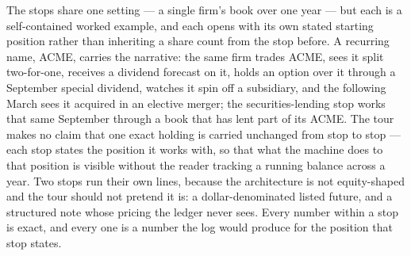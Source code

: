 The stops share one setting --- a single firm's book over one year --- but each is a
self-contained worked example, and each opens with its own stated starting position
rather than inheriting a share count from the stop before. A recurring name, ACME,
carries the narrative: the same firm trades ACME, sees it split two-for-one, receives
a dividend forecast on it, holds an option over it through a September special
dividend, watches it spin off a subsidiary, and the following March sees it acquired
in an elective merger; the securities-lending stop works that same September through a
book that has lent part of its ACME. The tour makes no claim that one exact holding is
carried unchanged from stop to stop --- each stop states the position it works with, so
that what the machine does to that position is visible without the reader tracking a
running balance across a year. Two stops run their own lines, because the architecture
is not equity-shaped and the tour should not pretend it is: a dollar-denominated listed
future, and a structured note whose pricing the ledger never sees. Every number within
a stop is exact, and every one is a number the log would produce for the position that
stop states.
